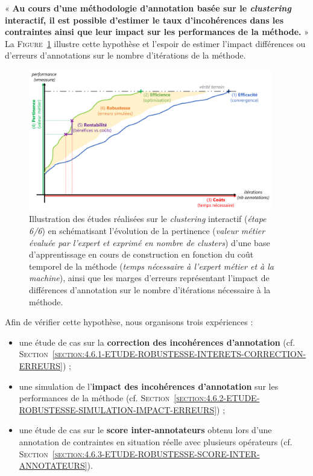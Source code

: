 	\begin{tcolorbox}[
		title=\faVial~\textbf{Hypothèse de robustesse}~\faVial,
		colback=colorTcolorboxHypothesis!15,
		colframe=colorTcolorboxHypothesis!75,
		width=\linewidth
	]
		« \textbf{
			Au cours d'une méthodologie d'annotation basée sur le \textit{clustering} interactif, il est possible d'estimer le taux d'incohérences dans les contraintes ainsi que leur impact sur les performances de la méthode.
		} » \\
		
		La \textsc{Figure~\ref{figure:4.6-HYPOTHESE-ROBUSTESSE}} illustre cette hypothèse et l'espoir de estimer l'impact différences ou d'erreurs d'annotations sur le nombre d'itérations de la méthode.
		\begin{figure}[H]  %
			\centering
			\includegraphics[width=0.95\textwidth]{figures/hypotheses-06-robustesse}
			\caption{
				Illustration des études réalisées sur le \textit{clustering} interactif (\textit{étape 6/6}) en schématisant l'évolution de la pertinence (\textit{valeur métier évaluée par l'expert et exprimé en nombre de clusters}) d'une base d'apprentissage en cours de construction en fonction du coût temporel de la méthode (\textit{temps nécessaire à l'expert métier et à la machine}), ainsi que les marges d'erreurs représentant l'impact de différences d'annotation sur le nombre d'itérations nécessaire à la méthode.
			}
			\label{figure:4.6-HYPOTHESE-ROBUSTESSE}
		\end{figure}
	\end{tcolorbox}
		
	Afin de vérifier cette hypothèse, nous organisons trois expériences :
	\begin{itemize}
		\item une étude de cas sur la \textbf{correction des incohérences d'annotation} (cf. \textsc{Section~\ref{section:4.6.1-ETUDE-ROBUSTESSE-INTERETS-CORRECTION-ERREURS}}) ;
		\item une simulation de l'\textbf{impact des incohérences d'annotation} sur les performances de la méthode (cf. \textsc{Section~\ref{section:4.6.2-ETUDE-ROBUSTESSE-SIMULATION-IMPACT-ERREURS}}) ;
		\item une étude de cas sur le \textbf{score inter-annotateurs} obtenu lors d'une annotation de contraintes en situation réelle avec plusieurs opérateurs (cf. \textsc{Section~\ref{section:4.6.3-ETUDE-ROBUSTESSE-SCORE-INTER-ANNOTATEURS}}).
	\end{itemize}
	
